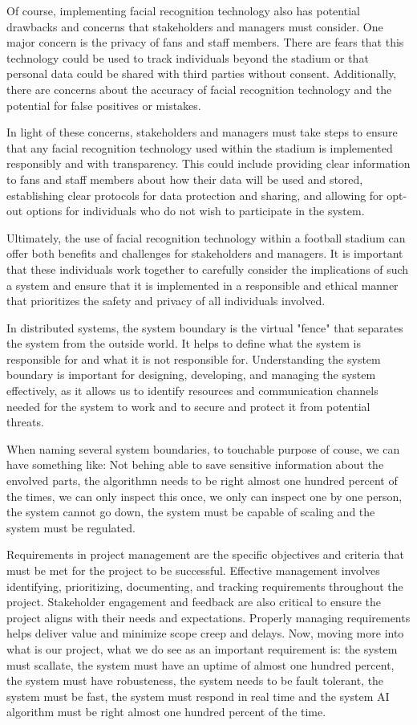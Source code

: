 Of course, implementing facial recognition technology also has potential drawbacks and concerns that stakeholders and managers must consider. One major concern is the privacy of fans and staff members. There are fears that this technology could be used to track individuals beyond the stadium or that personal data could be shared with third parties without consent. Additionally, there are concerns about the accuracy of facial recognition technology and the potential for false positives or mistakes.

In light of these concerns, stakeholders and managers must take steps to ensure that any facial recognition technology used within the stadium is implemented responsibly and with transparency. This could include providing clear information to fans and staff members about how their data will be used and stored, establishing clear protocols for data protection and sharing, and allowing for opt-out options for individuals who do not wish to participate in the system.

Ultimately, the use of facial recognition technology within a football stadium can offer both benefits and challenges for stakeholders and managers. It is important that these individuals work together to carefully consider the implications of such a system and ensure that it is implemented in a responsible and ethical manner that prioritizes the safety and privacy of all individuals involved.

In distributed systems, the system boundary is the virtual "fence" that separates the system from the outside world. It helps to define what the system is responsible for and what it is not responsible for. Understanding the system boundary is important for designing, developing, and managing the system effectively, as it allows us to identify resources and communication channels needed for the system to work and to secure and protect it from potential threats.

When naming several system boundaries, to touchable purpose of couse, we can have something like: Not behing able to save sensitive information about the envolved parts, the algorithmn needs to be right almost one hundred percent of the times, we can only inspect this once, we only can inspect one by one person, the system cannot go down, the system must be capable of scaling and the system must be regulated.

Requirements in project management are the specific objectives and criteria that must be met for the project to be successful. Effective management involves identifying, prioritizing, documenting, and tracking requirements throughout the project. Stakeholder engagement and feedback are also critical to ensure the project aligns with their needs and expectations. Properly managing requirements helps deliver value and minimize scope creep and delays. Now, moving more into what is our project, what we do see as an important requirement is: the system must scallate, the system must have an uptime of almost one hundred percent, the system must have robusteness, the system needs to be fault tolerant, the system must be fast, the system must respond in real time and the system AI algorithm must be right almost one hundred percent of the time.